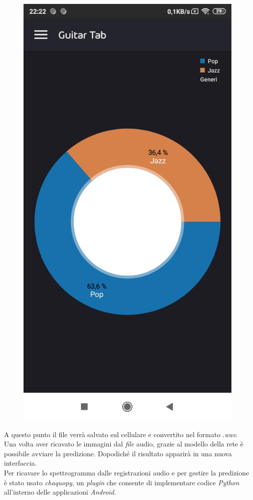 \begin{figure}[H]
	\includegraphics[scale=0.20]{./images/mobile04.jpg}
\end{figure}
\noindent A questo punto il file verrà salvato sul cellulare e convertito nel formato .\textit{wav}. Una volta aver ricavato le immagini dal \textit{file} audio, grazie al modello della rete è possibile avviare la predizione. Dopodiché il risultato apparirà in una nuova interfaccia.\\
\newline Per ricavare lo spettrogramma dalle registrazioni audio e per gestire la predizione è stato usato \textit{chaquopy}, un \textit{plugin} che consente di implementare codice \textit{Python} all'interno delle applicazioni \textit{Android}.

